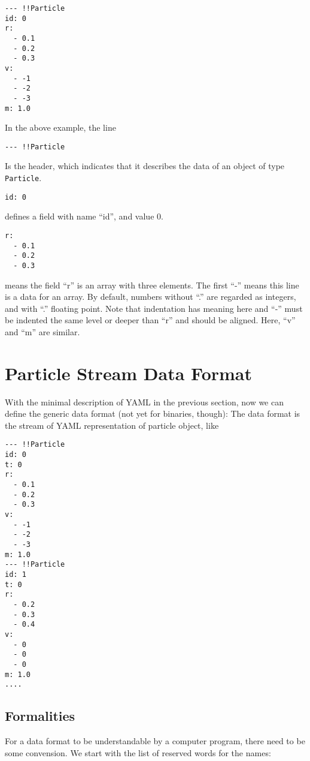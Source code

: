 \documentclass{elsart5p}
\begin{document}
\begin{verbatim}
--- !!Particle
id: 0
r:
  - 0.1
  - 0.2
  - 0.3
v:
  - -1
  - -2
  - -3
m: 1.0
\end{verbatim}

In the above example, the line

\begin{verbatim}
--- !!Particle
\end{verbatim}
Is the header, which indicates that it describes the data of an object
of type {\tt Particle}.


\begin{verbatim}
id: 0
\end{verbatim}
defines a field with name ``id'', and value 0.
\begin{verbatim}
r:
  - 0.1
  - 0.2
  - 0.3
\end{verbatim}
means the field ``r'' is an array with three elements. The
first ``-'' means this line is a data for an array.
By default, numbers without ``.'' are regarded as integers, and with
``.'' floating point. Note that indentation has meaning here and ``-''
must be indented the same level or deeper than ``r'' and should be aligned.
Here,  ``v'' and ``m'' are similar.


\section{Particle Stream Data Format}


With the  minimal description of YAML in the previous section, now
we can define the generic data format (not yet for binaries, though):
The data format is the stream of YAML representation of particle
object, like

\begin{verbatim}
--- !!Particle
id: 0
t: 0
r:
  - 0.1
  - 0.2
  - 0.3
v:
  - -1
  - -2
  - -3
m: 1.0
--- !!Particle
id: 1
t: 0
r:
  - 0.2
  - 0.3
  - 0.4
v:
  - 0
  - 0
  - 0
m: 1.0
....
\end{verbatim}

\subsection{Formalities}

For a data format to be understandable by a computer program, there
need to be some convension. We start with the list of reserved words
for the names:
\end{document}
